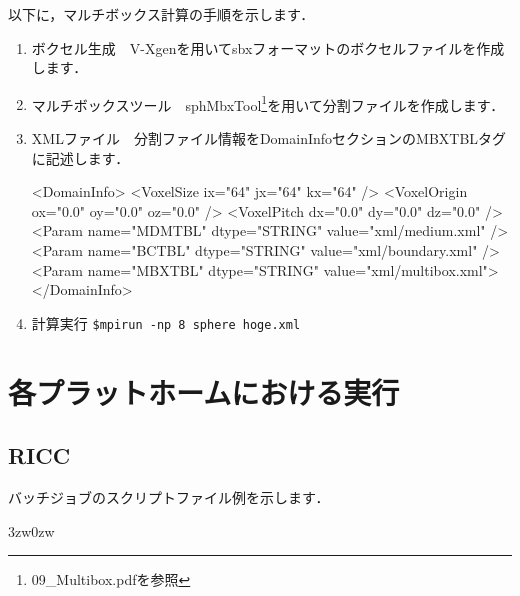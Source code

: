 以下に，マルチボックス計算の手順を示します．
\begin{enumerate}
\item ボクセル生成　V-Xgenを用いてsbxフォーマットのボクセルファイルを作成します．
\item マルチボックスツール　sphMbxTool\footnote{09\_Multibox.pdfを参照}を用いて分割ファイルを作成します．
\item XMLファイル　分割ファイル情報をDomainInfoセクションのMBXTBLタグに記述します．


{\small
\begin{program}
<DomainInfo>
  <VoxelSize   ix="64" jx="64" kx="64" />
  <VoxelOrigin ox="0.0" oy="0.0" oz="0.0" />
  <VoxelPitch  dx="0.0" dy="0.0" dz="0.0" />
  <Param name="MDMTBL" dtype="STRING" value="xml/medium.xml" />
  <Param name="BCTBL"  dtype="STRING" value="xml/boundary.xml" />
  <Param name="MBXTBL" dtype="STRING" value="xml/multibox.xml">
</DomainInfo>
\end{program}
}


\item 計算実行 \verb|$mpirun -np 8 sphere hoge.xml|
\end{enumerate}


%
\pagebreak
\section{各プラットホームにおける実行}
\label{sec:exec_platforms}

\subsection{RICC}
\label{sec:exec_RICC}
バッチジョブのスクリプトファイル例を示します．

\begin{indentation}{3zw}{0zw}

{\small
{}
}
\end{indentation}

